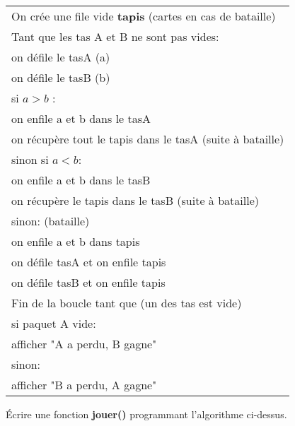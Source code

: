 \documentclass[11pt,a4paper]{article}
\begin{document}
\begin{center}
\begin{tabular}{|p{14cm}|}
\hline
On crée une file vide \textbf{tapis} (cartes en cas de bataille)\\
Tant que les tas A et B ne sont pas vides:\\
\hspace{1cm}on défile le tasA (a) \\
\hspace{1cm}on défile le tasB (b) \\
\hspace{1cm}si $a>b$ :\\
\hspace{2cm}on enfile a et b dans le tasA\\
\hspace{2cm}on récupère tout le tapis dans le tasA (suite à bataille)\\
\hspace{1cm}sinon si $a<b$:\\
\hspace{2cm}on enfile a et b dans le tasB\\
\hspace{2cm}on récupère le tapis dans le tasB (suite à bataille)\\
\hspace{1cm}sinon: (bataille)\\
\hspace{2cm}on enfile a et b dans tapis\\
\hspace{2cm}on défile tasA et on enfile tapis\\
\hspace{2cm}on défile tasB et on enfile tapis\\
Fin de la boucle tant que (un des tas est vide)\\
si paquet A vide:\\
\hspace{1cm}afficher "A a perdu, B gagne"\\
sinon:\\
\hspace{1cm}afficher "B a perdu, A gagne"\\
\hline
\end{tabular}
\end{center}

Écrire une fonction \textbf{jouer()} programmant l'algorithme ci-dessus.
\end{document}
